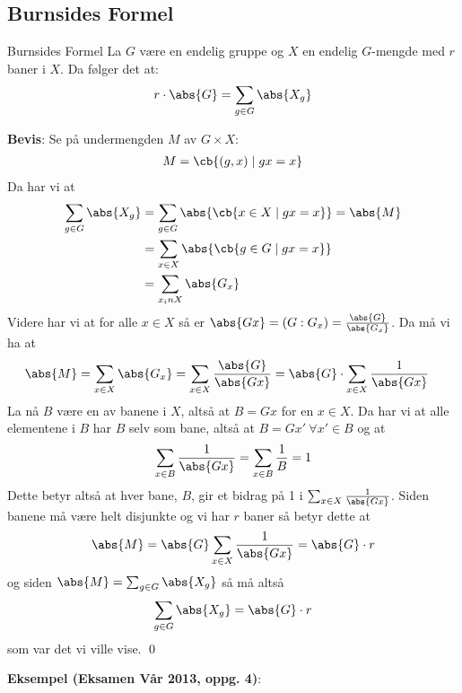 \subsection{Burnsides Formel}

\begin{theorem*}{Burnsides Formel}{}
  La $G$ være en endelig gruppe og $X$ en endelig $G$-mengde med $r$ baner i $X$. Da følger det at:
  \begin{align}
    r\cdot \abs{G} = \sum_{g\in G}\abs{X_g}
  \end{align}
\end{theorem*}

\textbf{Bevis}: Se på undermengden $M$ av $G\times X$:
\begin{align}
  M = \cb{(g,x)\mid gx=x}
\end{align}
Da har vi at 
\begin{align}
  \sum_{g\in G}\abs{X_g} &= \sum_{g\in G}\abs{\cb{x\in X\mid gx=x}} = \abs{M} \\
                         &= \sum_{x\in X}\abs{\cb{g\in G\mid gx=x}} \\
                         &= \sum_{x_in X}\abs{G_x}
\end{align}
Videre har vi at for alle $x\in X$ så er $\abs{Gx} = (G:G_x) = \frac{\abs{G}}{\abs{G_x}}$. Da
må vi ha at 
\begin{align}
  \abs{M} &= \sum_{x\in X}\abs{G_x} = \sum_{x\in X}\frac{\abs{G}}{\abs{Gx}} 
          = \abs{G}\cdot \sum_{x\in X} \frac{1}{\abs{Gx}}
\end{align}
La nå $B$ være en av banene i $X$, altså at $B = Gx$ for en $x \in X$. Da har vi at alle elementene
i $B$ har $B$ selv som bane, altså at $B = Gx'\ \forall x'\in B$ og at
\begin{align}
  \sum_{x\in B}\frac{1}{\abs{Gx}} = \sum_{x\in B}\frac1B = 1
\end{align}
Dette betyr altså at hver bane, $B$, gir et bidrag på 1 i $\sum_{x\in X} \frac{1}{\abs{Gx}}$. Siden
banene må være helt disjunkte og vi har $r$ baner så betyr dette at 
\begin{align}
  \abs{M} = \abs{G}\sum_{x\in X}\frac{1}{\abs{Gx}} = \abs{G}\cdot r
\end{align}
og siden $\abs{M} = \sum_{g\in G}\abs{X_g}$ så må altså
\begin{align}
  \sum_{g\in G}\abs{X_g} = \abs{G}\cdot r
\end{align}
som var det vi ville vise. \qed

\textbf{Eksempel (Eksamen Vår 2013, oppg. 4)}:

